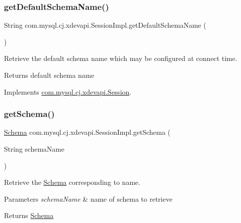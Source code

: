 \subsubsection{\texorpdfstring{get\+Default\+Schema\+Name()}{getDefaultSchemaName()}}
{\footnotesize\ttfamily String com.\+mysql.\+cj.\+xdevapi.\+Session\+Impl.\+get\+Default\+Schema\+Name (\begin{DoxyParamCaption}{ }\end{DoxyParamCaption})}

Retrieve the default schema name which may be configured at connect time.

\begin{DoxyReturn}{Returns}
default schema name 
\end{DoxyReturn}


Implements \mbox{\hyperlink{interfacecom_1_1mysql_1_1cj_1_1xdevapi_1_1_session_a9c612e7b080af6467b718dcaa3081a84}{com.\+mysql.\+cj.\+xdevapi.\+Session}}.

\mbox{\label{classcom_1_1mysql_1_1cj_1_1xdevapi_1_1_session_impl_aeb00f17f0c469af51f790c4a73666904}} 
\subsubsection{\texorpdfstring{get\+Schema()}{getSchema()}}
{\footnotesize\ttfamily \mbox{\hyperlink{interfacecom_1_1mysql_1_1cj_1_1xdevapi_1_1_schema}{Schema}} com.\+mysql.\+cj.\+xdevapi.\+Session\+Impl.\+get\+Schema (\begin{DoxyParamCaption}\item[{String}]{schema\+Name }\end{DoxyParamCaption})}

Retrieve the \mbox{\hyperlink{interfacecom_1_1mysql_1_1cj_1_1xdevapi_1_1_schema}{Schema}} corresponding to name.


\begin{DoxyParams}{Parameters}
{\em schema\+Name} & name of schema to retrieve \\
\hline
\end{DoxyParams}
\begin{DoxyReturn}{Returns}
\mbox{\hyperlink{interfacecom_1_1mysql_1_1cj_1_1xdevapi_1_1_schema}{Schema}} 
\end{DoxyReturn}


